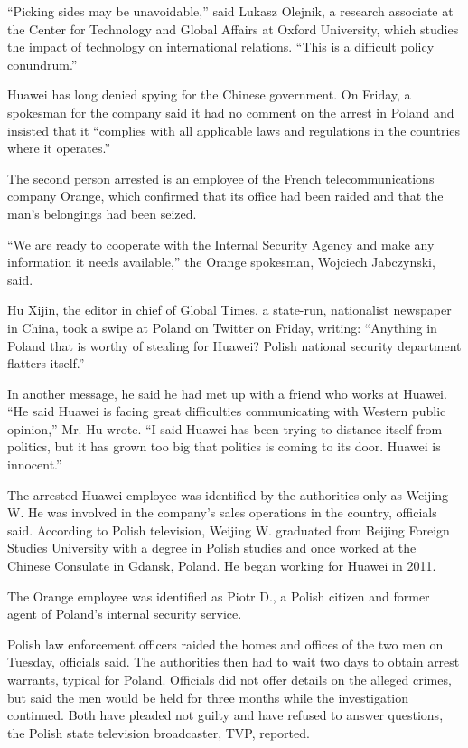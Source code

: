 ``Picking sides may be unavoidable,'' said Lukasz Olejnik, a research
associate at the Center for Technology and Global Affairs at Oxford
University, which studies the impact of technology on international
relations. ``This is a difficult policy conundrum.''

Huawei has long denied spying for the Chinese government. On Friday, a
spokesman for the company said it had no comment on the arrest in Poland
and insisted that it ``complies with all applicable laws and regulations
in the countries where it operates.''

The second person arrested is an employee of the French
telecommunications company Orange, which confirmed that its office had
been raided and that the man's belongings had been seized.

``We are ready to cooperate with the Internal Security Agency and make
any information it needs available,'' the Orange spokesman, Wojciech
Jabczynski, said.

Hu Xijin, the editor in chief of Global Times, a state-run, nationalist
newspaper in China, took a swipe at Poland on Twitter on Friday,
writing: ``Anything in Poland that is worthy of stealing for Huawei?
Polish national security department flatters itself.''

In another message, he said he had met up with a friend who works at
Huawei. ``He said Huawei is facing great difficulties communicating with
Western public opinion,'' Mr. Hu wrote. ``I said Huawei has been trying
to distance itself from politics, but it has grown too big that politics
is coming to its door. Huawei is innocent.''

The arrested Huawei employee was identified by the authorities only as
Weijing W. He was involved in the company's sales operations in the
country, officials said. According to Polish television, Weijing W.
graduated from Beijing Foreign Studies University with a degree in
Polish studies and once worked at the Chinese Consulate in Gdansk,
Poland. He began working for Huawei in 2011.

The Orange employee was identified as Piotr D., a Polish citizen and
former agent of Poland's internal security service.

Polish law enforcement officers raided the homes and offices of the two
men on Tuesday, officials said. The authorities then had to wait two
days to obtain arrest warrants, typical for Poland. Officials did not
offer details on the alleged crimes, but said the men would be held for
three months while the investigation continued. Both have pleaded not
guilty and have refused to answer questions, the Polish state television
broadcaster, TVP, reported.

